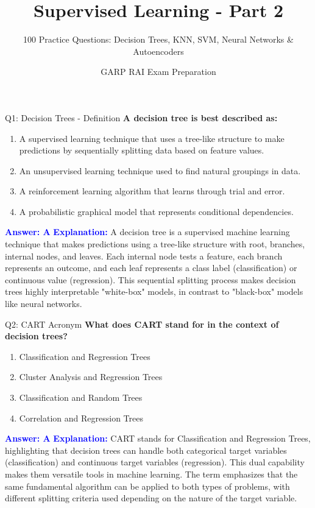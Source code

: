 \documentclass[8pt]{beamer}
\title{Supervised Learning - Part 2}
\subtitle{100 Practice Questions: Decision Trees, KNN, SVM, Neural Networks \& Autoencoders}
\author{GARP RAI Exam Preparation}
\date{}
\begin{document}
	
	\begin{frame}
		\titlepage
	\end{frame}
	
	
	\begin{frame}{Q1: Decision Trees - Definition}
		\fontsize{6.5}{7.5}\selectfont
		\textbf{A decision tree is best described as:}
		\begin{enumerate}
			\item A supervised learning technique that uses a tree-like structure to make predictions by sequentially splitting data based on feature values.
			\item An unsupervised learning technique used to find natural groupings in data.
			\item A reinforcement learning algorithm that learns through trial and error.
			\item A probabilistic graphical model that represents conditional dependencies.
		\end{enumerate}
		\vspace{0.1cm}
		\textcolor{blue}{\textbf{Answer: A}}
		\vspace{0.1cm}
		\textcolor{blue}{\textbf{Explanation:}} A decision tree is a supervised machine learning technique that makes predictions using a tree-like structure with root, branches, internal nodes, and leaves. Each internal node tests a feature, each branch represents an outcome, and each leaf represents a class label (classification) or continuous value (regression). This sequential splitting process makes decision trees highly interpretable "white-box" models, in contrast to "black-box" models like neural networks.
	\end{frame}
	
	\begin{frame}{Q2: CART Acronym}
		\fontsize{6.5}{7.5}\selectfont
		\textbf{What does CART stand for in the context of decision trees?}
		\begin{enumerate}
			\item Classification and Regression Trees
			\item Cluster Analysis and Regression Trees
			\item Classification and Random Trees
			\item Correlation and Regression Trees
		\end{enumerate}
		\vspace{0.1cm}
		\textcolor{blue}{\textbf{Answer: A}}
		\vspace{0.1cm}
		\textcolor{blue}{\textbf{Explanation:}} CART stands for Classification and Regression Trees, highlighting that decision trees can handle both categorical target variables (classification) and continuous target variables (regression). This dual capability makes them versatile tools in machine learning. The term emphasizes that the same fundamental algorithm can be applied to both types of problems, with different splitting criteria used depending on the nature of the target variable.
	\end{frame}
	
\end{document}
